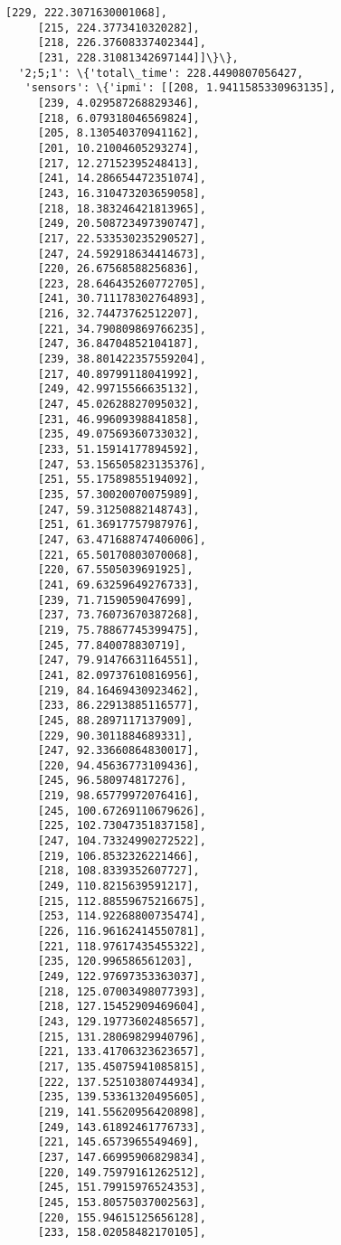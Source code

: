 \documentclass[11pt]{article}
\begin{document}
\begin{tcolorbox}[breakable, size=fbox, boxrule=.5pt, pad at break*=1mm, opacityfill=0]
\begin{Verbatim}[commandchars=\\\{\}]
     [229, 222.3071630001068],
     [215, 224.3773410320282],
     [218, 226.37608337402344],
     [231, 228.31081342697144]]\}\},
  '2;5;1': \{'total\_time': 228.4490807056427,
   'sensors': \{'ipmi': [[208, 1.9411585330963135],
     [239, 4.029587268829346],
     [218, 6.079318046569824],
     [205, 8.130540370941162],
     [201, 10.21004605293274],
     [217, 12.27152395248413],
     [241, 14.286654472351074],
     [243, 16.310473203659058],
     [218, 18.383246421813965],
     [249, 20.508723497390747],
     [217, 22.533530235290527],
     [247, 24.592918634414673],
     [220, 26.67568588256836],
     [223, 28.646435260772705],
     [241, 30.711178302764893],
     [216, 32.74473762512207],
     [221, 34.790809869766235],
     [247, 36.84704852104187],
     [239, 38.801422357559204],
     [217, 40.89799118041992],
     [249, 42.99715566635132],
     [247, 45.02628827095032],
     [231, 46.99609398841858],
     [235, 49.07569360733032],
     [233, 51.15914177894592],
     [247, 53.156505823135376],
     [251, 55.17589855194092],
     [235, 57.30020070075989],
     [247, 59.31250882148743],
     [251, 61.36917757987976],
     [247, 63.471688747406006],
     [221, 65.50170803070068],
     [220, 67.5505039691925],
     [241, 69.63259649276733],
     [239, 71.7159059047699],
     [237, 73.76073670387268],
     [219, 75.78867745399475],
     [245, 77.840078830719],
     [247, 79.91476631164551],
     [241, 82.09737610816956],
     [219, 84.16469430923462],
     [233, 86.22913885116577],
     [245, 88.2897117137909],
     [229, 90.3011884689331],
     [247, 92.33660864830017],
     [220, 94.45636773109436],
     [245, 96.580974817276],
     [219, 98.65779972076416],
     [245, 100.67269110679626],
     [225, 102.73047351837158],
     [247, 104.73324990272522],
     [219, 106.8532326221466],
     [218, 108.8339352607727],
     [249, 110.8215639591217],
     [215, 112.88559675216675],
     [253, 114.92268800735474],
     [226, 116.96162414550781],
     [221, 118.97617435455322],
     [235, 120.996586561203],
     [249, 122.97697353363037],
     [218, 125.07003498077393],
     [218, 127.15452909469604],
     [243, 129.19773602485657],
     [215, 131.28069829940796],
     [221, 133.41706323623657],
     [217, 135.45075941085815],
     [222, 137.52510380744934],
     [235, 139.53361320495605],
     [219, 141.55620956420898],
     [249, 143.61892461776733],
     [221, 145.6573965549469],
     [237, 147.66995906829834],
     [220, 149.75979161262512],
     [245, 151.79915976524353],
     [245, 153.80575037002563],
     [220, 155.94615125656128],
     [233, 158.02058482170105],

\end{Verbatim}
\end{tcolorbox}
\end{document}
